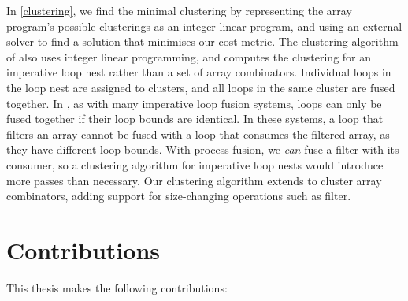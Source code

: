 In \cref{clustering}, we find the minimal clustering by representing the array program's possible clusterings as an integer linear program, and using an external solver to find a solution that minimises our cost metric.
The clustering algorithm of \citet{megiddo1998optimal} also uses integer linear programming, and computes the clustering for an imperative loop nest rather than a set of array combinators.
Individual loops in the loop nest are assigned to clusters, and all loops in the same cluster are fused together.
In \citet{megiddo1998optimal}, as with many imperative loop fusion systems, loops can only be fused together if their loop bounds are identical.
In these systems, a loop that filters an array cannot be fused with a loop that consumes the filtered array, as they have different loop bounds.
With process fusion, we \emph{can} fuse a filter with its consumer, so a clustering algorithm for imperative loop nests would introduce more passes than necessary.
Our clustering algorithm extends \citet{megiddo1998optimal} to cluster array combinators, adding support for size-changing operations such as filter.

\section{Contributions}

This thesis makes the following contributions:

